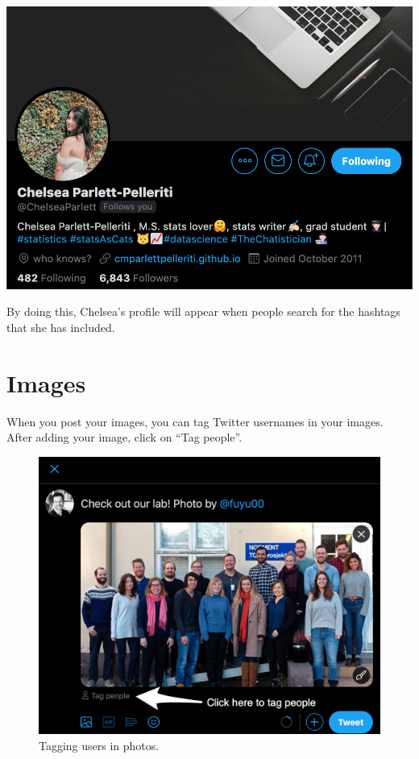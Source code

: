 \documentclass[
]{book}
\begin{document}
\begin{flushleft}\includegraphics[width=0.8\linewidth]{images/hashtagprofile} \end{flushleft}

By doing this, Chelsea's profile will appear when people search for the hashtags that she has included.

\hypertarget{images}{%
\section*{Images}\label{images}}

When you post your images, you can tag Twitter usernames in your images. After adding your image, click on ``Tag people''.

\begin{figure}

\includegraphics[width=0.8\linewidth]{images/tag} \hfill{}

\caption{Tagging users in photos.}\label{fig:unnamed-chunk-12}
\end{figure}
\end{document}
